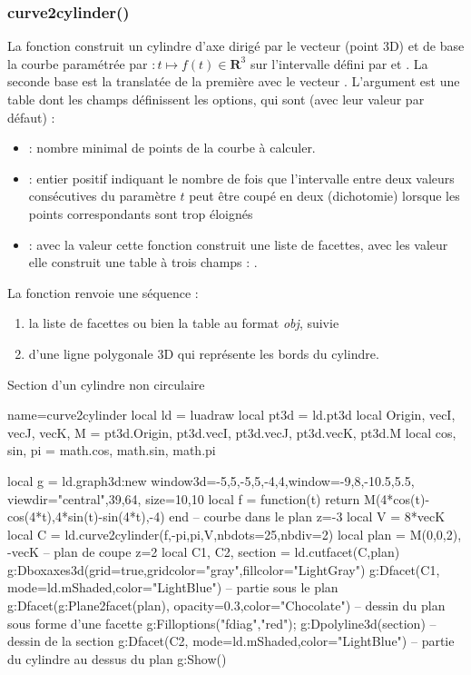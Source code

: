 \subsubsection{curve2cylinder()}
La fonction  construit un cylindre d'axe dirigé par le vecteur  (point 3D) et de base la courbe paramétrée par $\colon t\mapsto f(t)\in\mathbf R^3$ sur l'intervalle défini par  et . La seconde base est la translatée de la première avec le vecteur . L'argument  est une table dont les champs définissent les options, qui sont (avec leur valeur  par défaut) :
    \begin{itemize}
        \item {} : nombre minimal de points de la courbe à calculer.
        
        \item {} : entier positif indiquant le nombre de fois que l'intervalle entre deux valeurs consécutives du paramètre $t$ peut être coupé en deux (dichotomie) lorsque les points correspondants sont trop éloignés
        
        \item {} : avec la valeur \false cette fonction construit une liste de facettes, avec les valeur \true elle construit une table à trois champs : .
    \end{itemize}
La fonction renvoie une séquence : 
\begin{enumerate}
    \item la liste de facettes ou bien la table au format \emph{obj}, suivie 
    \item d'une ligne polygonale 3D qui représente les bords du cylindre.
\end{enumerate}
 
\begin{demo}{Section d'un cylindre non circulaire}
\begin{luadraw}{name=curve2cylinder}
local ld = luadraw
local pt3d = ld.pt3d
local Origin, vecI, vecJ, vecK, M = pt3d.Origin, pt3d.vecI, pt3d.vecJ, pt3d.vecK, pt3d.M
local cos, sin, pi = math.cos, math.sin, math.pi

local g = ld.graph3d:new{ window3d={-5,5,-5,5,-4,4},window={-9,8,-10.5,5.5},
    viewdir={"central",39,64}, size={10,10}}
local f = function(t) return M(4*cos(t)-cos(4*t),4*sin(t)-sin(4*t),-4) end -- courbe dans le plan z=-3
local V = 8*vecK
local C = ld.curve2cylinder(f,-pi,pi,V,{nbdots=25,nbdiv=2})
local plan = {M(0,0,2), -vecK} -- plan de coupe z=2
local C1, C2, section = ld.cutfacet(C,plan)
g:Dboxaxes3d({grid=true,gridcolor="gray",fillcolor="LightGray"})
g:Dfacet(C1, {mode=ld.mShaded,color="LightBlue"}) -- partie sous le plan
g:Dfacet(g:Plane2facet(plan), {opacity=0.3,color="Chocolate"}) -- dessin du plan sous forme d'une facette
g:Filloptions("fdiag","red"); g:Dpolyline3d(section) -- dessin de la section
g:Dfacet(C2, {mode=ld.mShaded,color="LightBlue"}) -- partie du cylindre au dessus du plan
g:Show()
\end{luadraw}
\end{demo}


